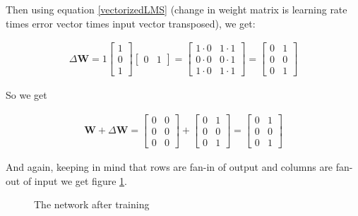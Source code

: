 Then using equation \eqref{vectorizedLMS} (change in weight matrix is learning rate times error vector times input vector transposed), we get:

\begin{align*}
\Delta \mathbf{W}  = 1
\begin{bmatrix} 1 \\ 0 \\ 1 \end{bmatrix} 
\begin{bmatrix} 0 & 1 \end{bmatrix} 
= \begin{bmatrix} 1 \cdot 0 & 1 \cdot 1 \\ 0 \cdot 0 & 0 \cdot 1 \\ 1 \cdot 0 & 1 \cdot 1 \end{bmatrix} 
= \begin{bmatrix} 0 & 1 \\ 0 & 0 \\  0 & 1  \end{bmatrix}
\end{align*}

So we get

\begin{align*}
\mathbf{W} + \Delta \mathbf{W}  =
\begin{bmatrix} 0 & 0 \\ 0 & 0 \\  0  & 0  \end{bmatrix} +
\begin{bmatrix} 0 & 1 \\ 0 & 0 \\  0  & 1  \end{bmatrix} =
\begin{bmatrix} 0 & 1 \\ 0 & 0 \\  0  & 1  \end{bmatrix}
\end{align*}

And again, keeping in mind that rows are fan-in of output and columns are fan-out of input we get figure \ref{lms_vector_2}.

\begin{figure}[h]
\centering
{}
\caption[Jeff Yoshimi.]{The network after training}
\label{lms_vector_2}
\end{figure}

